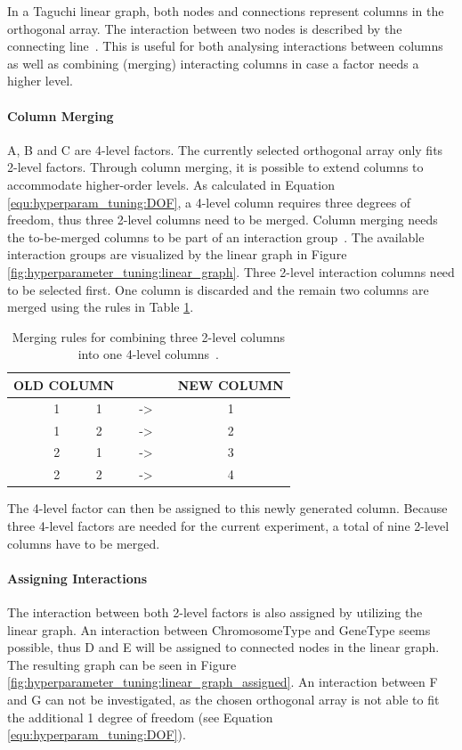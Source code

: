 In a Taguchi linear graph, both nodes and connections represent columns in the orthogonal array. The interaction between two nodes is described by the connecting line~\cite{taguchi_taguchis_2005}. This is useful for both analysing interactions between columns as well as combining (merging) interacting columns in case a factor needs a higher level.

\paragraph{Column Merging}
A, B and C are 4-level factors. The currently selected orthogonal array only fits 2-level factors. Through column merging, it is possible to extend columns to accommodate higher-order levels. As calculated in Equation \ref{equ:hyperparam_tuning:DOF}, a 4-level column requires three degrees of freedom, thus three 2-level columns need to be merged. Column merging needs the to-be-merged columns to be part of an interaction group~\cite{yang_design_2009}. The available interaction groups are visualized by the linear graph in Figure \ref{fig:hyperparameter_tuning:linear_graph}. Three 2-level interaction columns need to be selected first. One column is discarded and the remain two columns are merged using the rules in Table \ref{tab:hyperparameter_tuning:merging_rules}.

\begin{table}[ht]
	\centering
	\begin{tabular}{ |ccccccc|  }
		\hline
		\multicolumn{3}{|c}{ OLD COLUMN } & & & & NEW COLUMN \\
		\hline
		& 1 & 1 & & -> & & 1\\
		& 1 & 2 & & -> & & 2\\
		& 2 & 1 & & -> & & 3\\
		& 2 & 2 & & -> & & 4\\
		\hline
	\end{tabular}
	\caption{Merging rules for combining three 2-level columns into one 4-level columns~\cite{roy_primer_1990}.}
	\label{tab:hyperparameter_tuning:merging_rules}
\end{table}

The 4-level factor can then be assigned to this newly generated column. Because three 4-level factors are needed for the current experiment, a total of nine 2-level columns have to be merged.

\paragraph{Assigning Interactions}
The interaction between both 2-level factors is also assigned by utilizing the linear graph. An interaction between ChromosomeType and GeneType seems possible, thus D and E will be assigned to connected nodes in the linear graph. The resulting graph can be seen in Figure \ref{fig:hyperparameter_tuning:linear_graph_assigned}. An interaction between F and G can not be investigated, as the chosen orthogonal array is not able to fit the additional 1 degree of freedom (see Equation \ref{equ:hyperparam_tuning:DOF}).

